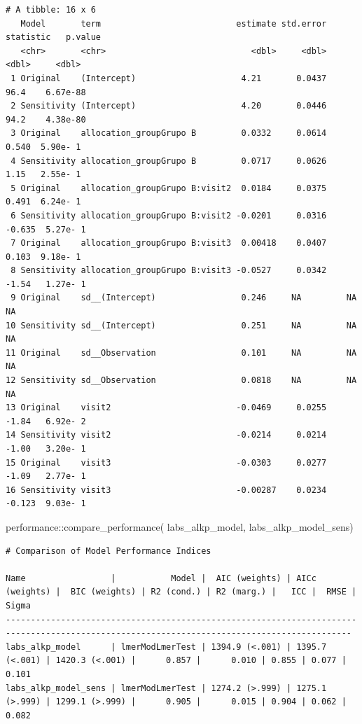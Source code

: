 \documentclass[
  12pt,
]{article}
\newenvironment{Shaded}{\begin{snugshade}}{\end{snugshade}}
\newcommand{\FunctionTok}[1]{\textcolor[rgb]{0.28,0.35,0.67}{#1}}
\newcommand{\NormalTok}[1]{\textcolor[rgb]{0.00,0.23,0.31}{#1}}
\newcommand{\SpecialCharTok}[1]{\textcolor[rgb]{0.37,0.37,0.37}{#1}}
\begin{document}
\begin{verbatim}
# A tibble: 16 x 6
   Model       term                           estimate std.error statistic   p.value
   <chr>       <chr>                             <dbl>     <dbl>     <dbl>     <dbl>
 1 Original    (Intercept)                     4.21       0.0437    96.4    6.67e-88
 2 Sensitivity (Intercept)                     4.20       0.0446    94.2    4.38e-80
 3 Original    allocation_groupGrupo B         0.0332     0.0614     0.540  5.90e- 1
 4 Sensitivity allocation_groupGrupo B         0.0717     0.0626     1.15   2.55e- 1
 5 Original    allocation_groupGrupo B:visit2  0.0184     0.0375     0.491  6.24e- 1
 6 Sensitivity allocation_groupGrupo B:visit2 -0.0201     0.0316    -0.635  5.27e- 1
 7 Original    allocation_groupGrupo B:visit3  0.00418    0.0407     0.103  9.18e- 1
 8 Sensitivity allocation_groupGrupo B:visit3 -0.0527     0.0342    -1.54   1.27e- 1
 9 Original    sd__(Intercept)                 0.246     NA         NA     NA       
10 Sensitivity sd__(Intercept)                 0.251     NA         NA     NA       
11 Original    sd__Observation                 0.101     NA         NA     NA       
12 Sensitivity sd__Observation                 0.0818    NA         NA     NA       
13 Original    visit2                         -0.0469     0.0255    -1.84   6.92e- 2
14 Sensitivity visit2                         -0.0214     0.0214    -1.00   3.20e- 1
15 Original    visit3                         -0.0303     0.0277    -1.09   2.77e- 1
16 Sensitivity visit3                         -0.00287    0.0234    -0.123  9.03e- 1
\end{verbatim}

\begin{Shaded}
\begin{Highlighting}[]
\NormalTok{performance}\SpecialCharTok{::}\FunctionTok{compare\_performance}\NormalTok{(}
\NormalTok{    labs\_alkp\_model, }
\NormalTok{    labs\_alkp\_model\_sens) }
\end{Highlighting}
\end{Shaded}

\begin{verbatim}
# Comparison of Model Performance Indices

Name                 |           Model |  AIC (weights) | AICc (weights) |  BIC (weights) | R2 (cond.) | R2 (marg.) |   ICC |  RMSE | Sigma
-------------------------------------------------------------------------------------------------------------------------------------------
labs_alkp_model      | lmerModLmerTest | 1394.9 (<.001) | 1395.7 (<.001) | 1420.3 (<.001) |      0.857 |      0.010 | 0.855 | 0.077 | 0.101
labs_alkp_model_sens | lmerModLmerTest | 1274.2 (>.999) | 1275.1 (>.999) | 1299.1 (>.999) |      0.905 |      0.015 | 0.904 | 0.062 | 0.082
\end{verbatim}
\end{document}
